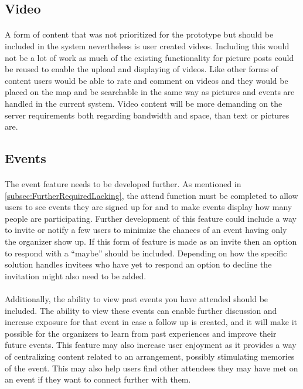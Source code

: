 \subsection{Video}
\label{subsec:FurtherRequiredVideo}

\paragraph{} A form of content that was not prioritized for the prototype but should be included in the system nevertheless is user created videos. Including this would not be a lot of work as much of the existing functionality for picture posts could be reused to enable the upload and displaying of videos. Like other forms of content users would be able to rate and comment on videos and they would be placed on the map and be searchable in the same way as pictures and events are handled in the current system. Video content will be more demanding on the server requirements both regarding bandwidth and space, than text or pictures are.

\subsection{Events}
\label{subsec:FurtherRequredEvents}

\paragraph{} The event feature needs to be developed further. As mentioned in \ref{subsec:FurtherRequiredLacking}, the attend function must be completed to allow users to see events they are signed up for and to make events display how many people are participating. Further development of this feature could include a way to invite or notify a few users to minimize the chances of an event having only the organizer show up. If this form of feature is made as an invite then an option to respond with a “maybe” should be included. Depending on how the specific solution handles invitees who have yet to respond an option to decline the invitation might also need to be added.
\paragraph{} Additionally, the ability to view past events you have attended should be included. The ability to view these events can enable further discussion and increase exposure for that event in case a follow up is created, and it will make it possible for the organizers to learn from past experiences and improve their future events. This feature may also increase user enjoyment as it provides a way of centralizing content related to an arrangement, possibly stimulating memories of the event. This may also help users find other attendees they may have met on an event if they want to connect further with them.

